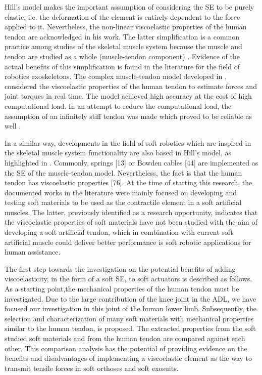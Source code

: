 Hill's model makes the important assumption of considering the SE to be purely elastic, i.e. the deformation of the element is entirely dependent to the force applied to it. Nevertheless, the non-linear viscoelastic properties of the human tendon are acknowledged in his work. The latter simplification is a common practice among studies of the skeletal muscle system because the muscle and tendon are studied as a whole (muscle-tendon component) \cite{zajac1989muscle}. Evidence of the actual benefits of this simplification is found in the literature for the field of robotics exoskeletons. The complex muscle-tendon model developed in \cite{lloyd2003emg}, considered the viscoelastic properties of the human tendon to estimate forces and joint torques in real time. The model achieved high accuracy at the cost of high computational load. In an attempt to reduce the computational load, the assumption of an infinitely stiff tendon was made which proved to be reliable as well \cite{sartori2009stiff}.

In a similar way, developments in the field of soft robotics which are inspired in the skeletal muscle system functionality are also based in Hill's model, as highlighted in . Commonly, springs [13] or Bowden cables [44] are implemented as the SE of the muscle-tendon model. Nevertheless, the fact is that the human tendon has viscoelastic properties [76]. At the time of starting this research, the documented works in the literature were mainly focused on developing and testing soft materials to be used as the contractile element in a soft artificial muscles. The latter, previously identified as a research opportunity, indicates that the viscoelastic properties of soft materials have not been studied with the aim of developing a soft artificial tendon, which in combination with current soft artificial muscle could deliver better performance is soft robotic applications for human assistance.

The first step towards the investigation on the potential benefits of adding viscoelasticity, in the form of a soft SE, to soft actuators is described as follows. As a starting point,the mechanical properties of the human tendon must be investigated. Due to the large contribution of the knee joint in the ADL, we have focused our investigation in this joint of the human lower limb. Subsequently, the selection and characterization of many soft materials with mechanical properties similar to the human tendon, is proposed. The extracted properties from the soft studied soft materials and from the human tendon are compared against each other. This comparison analysis has the potential of providing evidence on the benefits and disadvantages of implementing a viscoelastic element as the way to transmit tensile forces in soft orthoses and soft exosuits.

